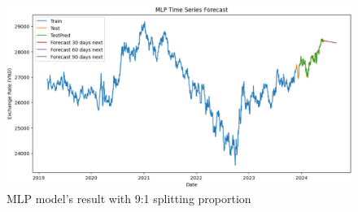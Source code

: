 \documentclass{ieeeojies}
\begin{document}
\begin{figure}[H]
  \centering
  \begin{minipage}{0.8\linewidth}
    \centering
    \includegraphics[width=\linewidth]{MLP/mlp_eur_91.png}
    \caption{MLP model's result with 9:1 splitting proportion}
    \label{fig17}
  \end{minipage}
\end{figure}
\end{document}
